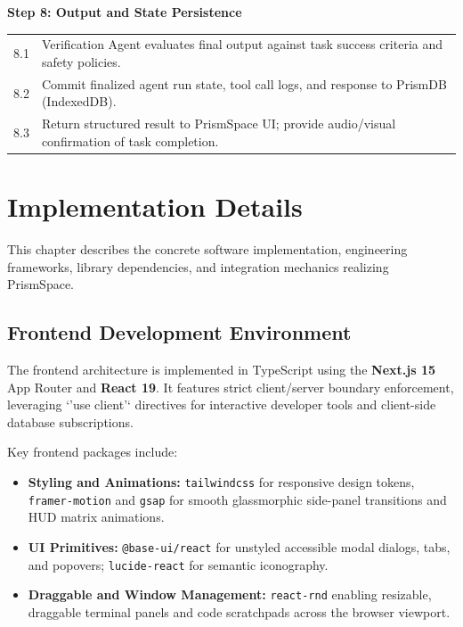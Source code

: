 \documentclass[12pt,a4paper]{report}
\begin{document}
\vspace{4pt}
\noindent\textbf{Step 8: Output and State Persistence}
\vspace{4pt}

\noindent\begin{tabular}{p{1cm} p{12.5cm}}
8.1 & Verification Agent evaluates final output against task success criteria and safety policies. \\
8.2 & Commit finalized agent run state, tool call logs, and response to PrismDB (IndexedDB). \\
8.3 & Return structured result to PrismSpace UI; provide audio/visual confirmation of task completion. \\
\end{tabular}


\chapter{Implementation Details}

This chapter describes the concrete software implementation, engineering frameworks, library dependencies, and integration mechanics realizing PrismSpace.

\section{Frontend Development Environment}
The frontend architecture is implemented in TypeScript using the \textbf{Next.js 15} App Router and \textbf{React 19}. It features strict client/server boundary enforcement, leveraging `'use client'` directives for interactive developer tools and client-side database subscriptions.

Key frontend packages include:
\begin{itemize}
    \item \textbf{Styling and Animations:} \texttt{tailwindcss} for responsive design tokens, \texttt{framer-motion} and \texttt{gsap} for smooth glassmorphic side-panel transitions and HUD matrix animations.
    \item \textbf{UI Primitives:} \texttt{@base-ui/react} for unstyled accessible modal dialogs, tabs, and popovers; \texttt{lucide-react} for semantic iconography.
    \item \textbf{Draggable and Window Management:} \texttt{react-rnd} enabling resizable, draggable terminal panels and code scratchpads across the browser viewport.
\end{itemize}
\end{document}

